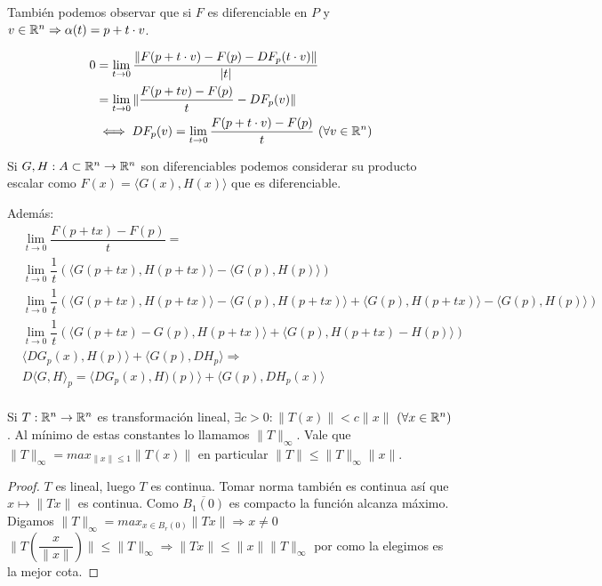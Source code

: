 También podemos observar que si $F$ es diferenciable en $P$ y $v \in \mathbb{R}^n \Rightarrow \alpha(t) = p + t \cdot v$.

\begin{align*}
  0 & = \lim_{t \to 0} \dfrac{\| F(p + t \cdot v) - F(p) - DF_p(t \cdot v) \|}{|t|}                 \\
    & = \lim_{t \to 0} \| \dfrac{F(p + tv) - F(p)}{t} - DF_p(v) \|                                  \\
    & \iff DF_p(v) = \lim_{t \to 0} \dfrac{F(p+t \cdot v) - F(p)}{t} \text{  } (\forall v \in \mathbb{R}^n)
\end{align*}

\begin{note}
  Si $G, H: A \subset \mathbb{R}^n \to \mathbb{R}^n$ son diferenciables podemos considerar su producto escalar como $F(x) = \langle G(x), H(x) \rangle$ que es diferenciable.

  Además:
  \begin{align*}
     & \lim_{t \to 0} \dfrac{F(p + tx) - F(p)}{t} =                                                                                                                 \\
     & \lim_{t \to 0} \dfrac{1}{t} ( \langle G(p + tx), H(p+tx) \rangle - \langle G(p), H(p) \rangle )                                                              \\
     & \lim_{t \to 0} \dfrac{1}{t} ( \langle G(p+tx), H(p+tx) \rangle - \langle G(p), H(p+tx) \rangle + \langle G(p), H(p+tx) \rangle - \langle G(p), H(p) \rangle) \\
     & \lim_{t \to 0} \dfrac{1}{t} (\langle G(p+tx) - G(p), H(p + tx) \rangle + \langle G(p), H(p+tx) - H(p) \rangle)                                               \\
     & \langle DG_p(x), H(p) \rangle + \langle G(p), DH_p \rangle \Rightarrow                                                                                       \\
     & D\langle G, H \rangle_p = \langle DG_p(x), H)(p) \rangle + \langle G(p), DH_p(x) \rangle                                                                     \\
  \end{align*}
\end{note}

\begin{lemma}
  Si $T: \mathbb{R}^n \to \mathbb{R}^n$ es transformación lineal, $\exists c > 0: \|T(x)\| < c \|x\|$ $(\forall x \in \mathbb{R}^n)$. Al mínimo de estas constantes lo llamamos $\|T\|_{\infty}$. Vale que $\|T\|_{\infty} = max_{\|x\| \leq 1} \|T(x)\|$ en particular
  $\|T\| \leq \|T\|_{\infty} \|x\|$.
  \begin{proof}
    $T$ es lineal, luego $T$ es continua. Tomar norma también es continua así que $x \mapsto \|Tx\|$ es continua. Como $\overline{B_1(0)}$ es compacto la función alcanza máximo. Digamos $\|T\|_{\infty} = max_{x \in B_r(0)} \|Tx\| \Rightarrow x \neq 0$ \\
    $\|T(\dfrac{x}{\|x\|})\| \leq \|T\|_{\infty} \Rightarrow \|Tx\| \leq \|x\| \|T\|_{\infty}$ por como la elegimos es la mejor cota.
  \end{proof}
\end{lemma}

